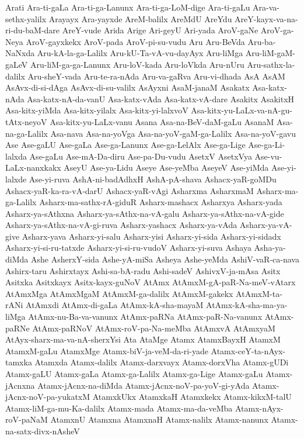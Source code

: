 {Arati
Ara-ti-gaLa
Ara-ti-ga-Lanunx
Ara-ti-ga-LoM-dige
Ara-ti-gaLu
Ara-va-sethx-yalilx
Arayayx
Ara-yayxde
AreM-balilx
AreMdU
AreYdu
AreY-kayx-va-na-ri-du-baM-dare
AreY-vude
Arida
Arige
Ari-geyU
Ari-yada
AroV-gaNe
AroV-ga-Neya
AroV-gayxkekx
AroV-pada
AroV-pi-su-vudu
Aru
Aru-BeVda
Aru-ba-NaNxda
Aru-kA-la-ga-Lalilx
Aru-kU-Ta-vA-vu-dayAyx
Aru-liMga
Aru-liM-gaM-gaLeV
Aru-liM-ga-ga-Lanunx
Aru-loV-kada
Aru-loVkda
Aru-nUru
Aru-sathx-la-dalilx
Aru-sheY-vada
Aru-te-ra-nAda
Aru-va-gaRva
Aru-vi-dhada
AsA
AsAM
AsAvx-di-si-dAga
AsAvx-di-su-valilx
AsAyxni
AsaM-janaM
Asakatx
Asa-katx-nAda
Asa-katx-nA-da-vanU
Asa-katx-vAda
Asa-katx-vA-dare
Asakitx
AsakitxH
Asa-kitx-yiMda
Asa-kitx-yilalx
Asa-kitx-yi-lalxvoV
Asa-kitx-yu-LaLx-va-nA-gu-tAtx-neyoV
Asa-kitx-yu-LaLx-vanu
Asana
Asa-na-BeV-daM-gaLu
AsanaM
Asa-na-ga-Lalilx
Asa-nava
Asa-na-yoVga
Asa-na-yoV-gaM-ga-Lalilx
Asa-na-yoV-gavu
Ase
Ase-gaLU
Ase-gaLa
Ase-ga-Lanunx
Ase-ga-LelAlx
Ase-ga-Lige
Ase-ga-Li-lalxda
Ase-gaLu
Ase-mA-Da-diru
Ase-pa-Du-vudu
AsetxV
AsetxVya
Ase-vu-LaLx-nanxkakx
AseyU
Ase-ya-Lidu
Aseye
Ase-yeMba
AseyeV
Ase-yiMda
Ase-yi-lalxde
Ase-yi-ruva
AshA-ni-badAdhxH
AshA-pA-shava
Ashacx-yaR-goMDu
Ashacx-yaR-ka-ra-vA-darU
Ashacx-yaR-vAgi
Asharxma
AsharxmaM
Asharx-ma-ga-Lalilx
Asharx-ma-sathx-rA-giduR
Asharx-mashacx
Asharxya
Asharx-yada
Asharx-ya-sAthxna
Asharx-ya-sAthx-na-vA-galu
Asharx-ya-sAthx-na-vA-gide
Asharx-ya-sAthx-na-vA-gi-ruva
Asharx-yashacx
Asharx-ya-vAda
Asharx-ya-vA-give
Asharx-yava
Asharx-yi-salu
Asharx-yisi
Asharx-yi-sida
Asharx-yi-sidadx
Asharx-yi-si-ru-tatxde
Asharx-yi-si-ru-vudoV
Asharx-yi-suva
Ashaya
Asha-ya-diMda
Ashe
AsherxY-sida
Ashe-yA-miSa
Asheya
Ashe-yeMda
AshiV-vaR-ca-nava
Ashirx-taru
Ashirxtayx
Ashi-sa-bA-radu
Ashi-sadeV
AshivxV-ja-mAsa
Asitx
Asitxka
Asitxkayx
Asitx-kayx-guNoV
AtAmx
AtAmxM-gA-paR-Na-meV-vAtarx
AtAmxMga
AtAmxMgaM
AtAmxM-ga-dalilx
AtAmxM-gakekx
AtAmxM-ta-rANi
AtAmxdi
AtAmx-di-gaLa
AtAmx-kA-sha-mayaM
AtAmx-kA-sha-ma-ya-liMga
AtAmx-nu-Ba-va-vanunx
AtAmx-paRNa
AtAmx-paR-Na-vanunx
AtAmx-paRNe
AtAmx-paRNoV
AtAmx-roV-pa-Na-meMba
AtAmxvA
AtAmxyaM
AtAyx-sharx-ma-va-nA-sherxYsi
Ata
AtaMge
Atamx
AtamxBayxH
AtamxM
AtamxM-gaLu
AtamxMge
Atamx-biV-ja-veM-da-ri-yade
Atamx-ceY-ta-nAyx-tamxka
Atamxda
Atamx-dalilx
Atamx-darxvayx
Atamx-dorxVha
Atamx-gUDi
Atamx-gaLU
Atamx-gaLa
Atamx-ga-Lalilx
Atamx-ga-Lige
Atamx-gaLu
Atamx-jAcnxna
Atamx-jAcnx-na-diMda
Atamx-jAcnx-noV-pa-yoV-gi-yAda
Atamx-jAcnx-noV-pa-yukatxM
AtamxkUkx
AtamxkaH
Atamxkekx
Atamx-kikxM-talU
Atamx-liM-ga-mu-Ka-dalilx
Atamx-mada
Atamx-ma-da-veMba
Atamx-nAyx-roV-paNaM
AtamxnU
Atamxna
AtamxnaH
Atamx-nalilx
Atamx-nanunx
Atamx-na-satx-divx-nAsheV
}
